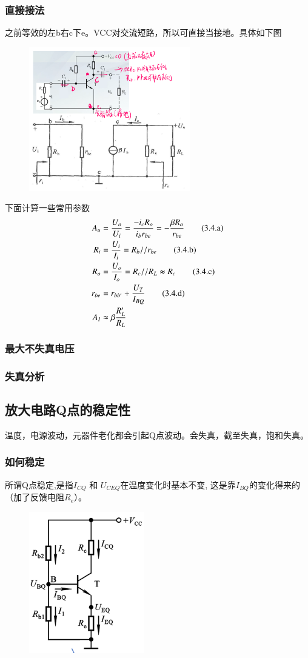\subsubsection{直接接法}
之前等效的左b右c下e。VCC对交流短路，所以可直接当接地。具体如下图
        \begin{figure}[H]
            \centering
            \includegraphics[width=7cm]{img/2.11.png}
            \end{figure}
下面计算一些常用参数
\begin{align}
    A_{u}&= \frac{U_{o}}{U_{i}}= \frac{-i_{c}R_{o}}{i_{b}r_{be}}=- \frac{\beta R_{o}}{r_{be}} \tag{3.4.a} \\
    R_i&=\frac{U_i}{I_i}=R_b // r_{be} \tag{3.4.b}\\
    R_o&=\frac{U_o}{I_o}=R_c // R_L\thickapprox R_c \tag{3.4.c}\\
    r_{be}&=r_{bb'}+\frac{U_T}{I_{BQ}} \tag{3.4.d}\\
    A_I&\thickapprox \beta \frac{R_{L}'}{R_L}
\end{align}
\subsubsection{最大不失真电压}
\subsubsection{失真分析}
\subsection{放大电路Q点的稳定性}
温度，电源波动，元器件老化都会引起Q点波动。会失真，截至失真，饱和失真。
\subsubsection{如何稳定}
所谓Q点稳定,是指$ I_{CQ} $ 和 $ U_{CEQ} $在温度变化时基本不变,
这是靠$ I_{BQ} $的变化得来的（加了反馈电阻$R_e$）。
        \begin{figure}[H]
            \centering
            \includegraphics[width=5cm]{img/2.13.png}
            \end{figure}

